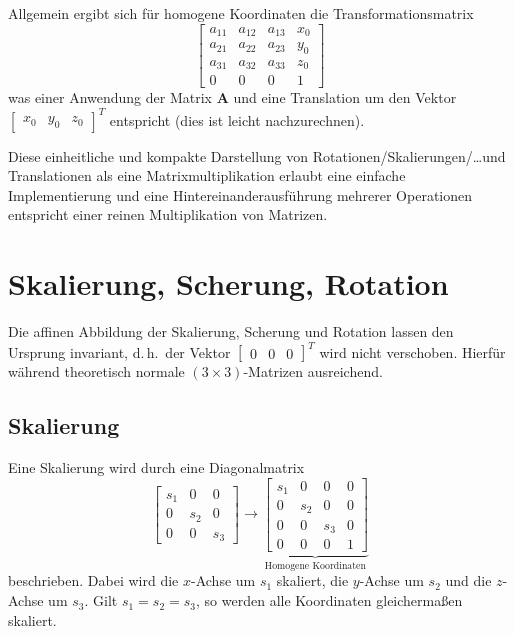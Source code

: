 \documentclass[a4paper, 11pt, accentcolor = tud3b]{tudreport}
\newcommand{\mat}[1]{\boldsymbol{#1}}
\renewcommand{\dh}{d.\,h.~}
\begin{document}
				Allgemein ergibt sich für homogene Koordinaten die Transformationsmatrix
				\begin{equation*}
					\begin{bmatrix}
						a_{11} & a_{12} & a_{13} & x_0 \\
						a_{21} & a_{22} & a_{23} & y_0 \\
						a_{31} & a_{32} & a_{33} & z_0 \\
						0      & 0      & 0      & 1
					\end{bmatrix}
				\end{equation*}
				was einer Anwendung der Matrix \( \mat{A} \) und eine Translation um den Vektor \( \begin{bmatrix} x_0 & y_0 & z_0 \end{bmatrix}^T \) entspricht (dies ist leicht nachzurechnen).
				
				Diese einheitliche und kompakte Darstellung von Rotationen/Skalierungen/\dots und Translationen als eine Matrixmultiplikation erlaubt eine einfache Implementierung und eine Hintereinanderausführung mehrerer Operationen entspricht einer reinen Multiplikation von Matrizen.

		\section{Skalierung, Scherung, Rotation}
			Die affinen Abbildung der Skalierung, Scherung und Rotation lassen den Ursprung invariant, \dh der Vektor \( \begin{bmatrix} 0 & 0 & 0 \end{bmatrix}^T \) wird nicht verschoben. Hierfür während theoretisch normale \( (3 \times 3) \)-Matrizen ausreichend.

			\subsection{Skalierung}
				Eine Skalierung wird durch eine Diagonalmatrix
				\begin{equation*}
					\begin{bmatrix}
						s_1 & 0   & 0   \\
						0   & s_2 & 0   \\
						0   & 0   & s_3
					\end{bmatrix}
					\to
					\underbrace{
						\begin{bmatrix}
							s_1 & 0   & 0   & 0 \\
							0   & s_2 & 0   & 0 \\
							0   & 0   & s_3 & 0 \\
							0   & 0   & 0   & 1
						\end{bmatrix}
					}_\text{Homogene Koordinaten}
				\end{equation*}
				beschrieben. Dabei wird die \(x\)-Achse um \(s_1\) skaliert, die \(y\)-Achse um \(s_2\) und die \(z\)-Achse um \(s_3\). Gilt \( s_1 = s_2 = s_3 \), so werden alle Koordinaten gleichermaßen skaliert.
\end{document}
